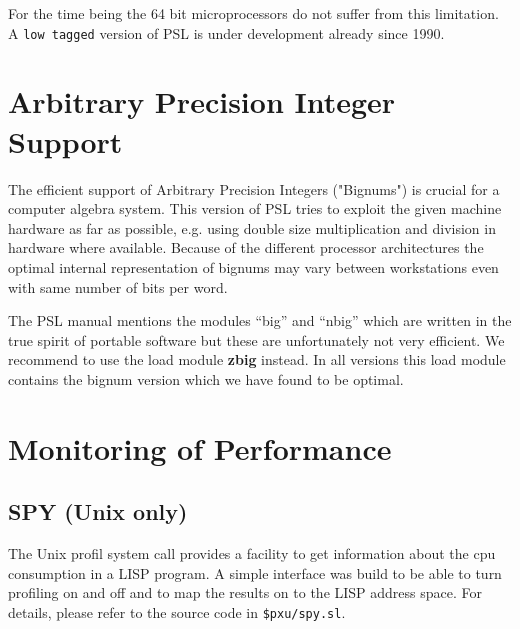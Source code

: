 For the time being the 64 bit microprocessors do not suffer from this
limitation. A {\tt low tagged} version of PSL is under development
already since 1990.

\section{Arbitrary Precision Integer Support}

The efficient support of Arbitrary Precision Integers ("Bignums")
is crucial for a computer algebra system. This version of PSL tries to
exploit the given machine hardware as far as possible, e.g. using double
size multiplication and division in hardware where available. Because of
the different processor architectures the optimal internal representation 
of bignums may vary between workstations even with same number 
of bits per word. 

The PSL manual mentions the modules ``big'' and ``nbig'' which are
written in the true spirit of portable software but these are unfortunately
not very efficient. We recommend to use the load module
{\bf zbig} instead. In all versions this load module contains 
the bignum version which we have found to be optimal.

\section{Monitoring of Performance}

\subsection{SPY (Unix only)}

The Unix profil system call provides a facility to get information 
about the cpu consumption in a LISP program. A simple interface was
build to be able to turn profiling on and off and to map the results
on to the LISP address space. For details, please refer to the source
code in \verb+$pxu/spy.sl+.
\\



